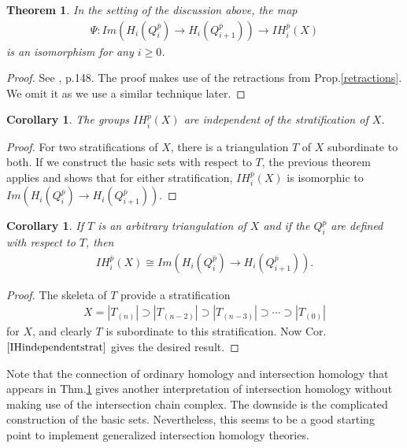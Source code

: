 \documentclass{scrreprt}
\newtheorem{theorem}[prop]{Theorem}
\newtheorem{corollar}[prop]{Corollary}
\begin{document}
\begin{theorem}\label{theorembasicsets}
In the setting of the discussion above, the map
\begin{align*}
\Psi: Im(H_i(Q_{i}^{\overline{p}}) \to H_i(Q_{i+1}^{\overline{p}})) \to IH_i^{\overline{p}}(X)
\end{align*}
is an isomorphism for any $i \geq 0$.
\end{theorem}

\begin{proof}
See \cite{GM}, p.148. The proof makes use of the retractions from Prop.\ref{retractions}. We omit it as we use a similar technique later.
\end{proof}

\begin{corollar}\label{IHindependentstrat}
The groups $IH_i^{\overline{p}}(X)$ are independent of the stratification of $X$.
\end{corollar}

\begin{proof}
For two stratifications of $X$, there is a triangulation $T$ of $X$ subordinate to both. If we construct the basic sets with respect to $T$, the previous theorem applies and shows that for either stratification, $IH_i^{\overline{p}}(X)$ is isomorphic to $Im(H_i(Q_{i}^{\overline{p}}) \to H_i(Q_{i+1}^{\overline{p}}))$.
\end{proof}

\begin{corollar}\label{IHindependenttriang}
If $T$ is an arbitrary triangulation of $X$ and if the $Q_i^{\overline{p}}$ are defined with respect to $T$, then
\begin{align*}
IH_i^{\overline{p}}(X) \cong Im(H_i(Q_{i}^{\overline{p}}) \to H_i(Q_{i+1}^{\overline{p}})).
\end{align*}
\end{corollar}

\begin{proof}
The skeleta of $T$ provide a stratification
\begin{align*}
X= |T_{(n)}| \supset |T_{(n-2)}| \supset |T_{(n-3)}| \supset \cdots \supset |T_{(0)}|
\end{align*}
for $X$, and clearly $T$ is subordinate to this stratification. Now Cor.$\ref{IHindependentstrat}$ gives the desired result.
\end{proof}

Note that the connection of ordinary homology and intersection homology that appears in Thm.\ref{theorembasicsets} gives another interpretation of intersection homology without making use of the intersection chain complex. The downside is the complicated construction of the basic sets. Nevertheless, this seems to be a good starting point to implement generalized intersection homology theories.
\end{document}
